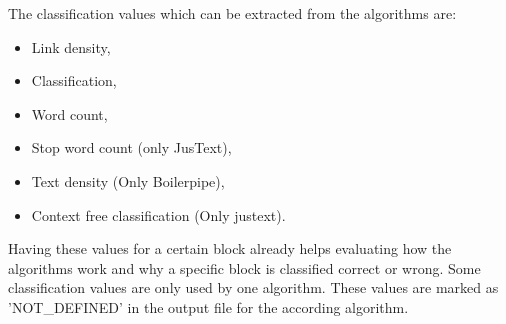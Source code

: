 The classification values which can be extracted from the algorithms are:

\begin{itemize}
\item Link density,
\item Classification,
\item Word count,
\item Stop word count (only JusText),
\item Text density (Only Boilerpipe),
\item Context free classification (Only justext).
\end{itemize}

Having these values for a certain block already helps evaluating how the algorithms work and why a specific block is classified correct or wrong. Some classification values are only used by one algorithm. These values are marked as 'NOT\_DEFINED' in the output file for the according algorithm.
